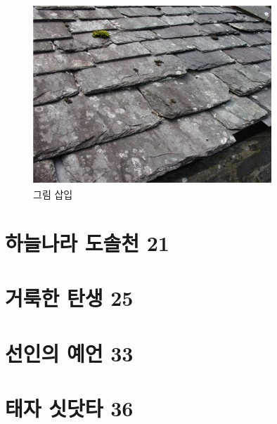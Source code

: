\documentclass[12pt, a4paper, oneside]{book}
\let\stdsection\section
\renewcommand\section{\newpage\stdsection}
\begin{document}
		\begin{figure}

			\begin{center}
			\includegraphics[width=0.8\textwidth]{./fig/slate_0001.jpg}
			\end{center}
			\caption{그림 삽입}

		\end{figure}


%
	\section{하늘나라 도솔천 21 }

%
	\section{거룩한 탄생 25 }

%
	\section{선인의 예언 33 }

%
	\section{태자 싯닷타 36 }
\end{document}
